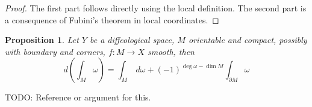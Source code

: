 \documentclass{scrartcl}
\theoremstyle{plain}
\newtheorem{theorem}{Theorem}[section]
\newtheorem{proposition}[theorem]{Proposition}
\theoremstyle{definition}
\begin{document}
\begin{proof}
    The first part follows directly using the local definition. The second part is a consequence of Fubini's theorem in local coordinates. 
\end{proof}

\begin{proposition}
    Let $Y$ be a diffeological space, $M$ orientable and compact, possibly with boundary and corners, $f\colon M\to X$ smooth, then
    $$d\left(\int_M\omega\right) = \int_M\ d\omega + (-1)^{\deg \omega - \dim M}\int_{\partial M} \omega$$
\end{proposition}

TODO: Reference or argument for this.


\end{document}
